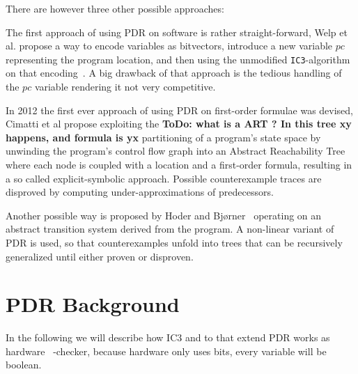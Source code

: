 \documentclass[11pt, a4paper, BCOR=10mm, ngerman]{scrbook}
\begin{document}
There are however three other possible approaches:

The first approach of using PDR on software is rather straight-forward, Welp et al. propose a way to encode variables as bitvectors, introduce a new variable $pc$ representing the program location, and then using the unmodified \texttt{IC3}-algorithm on that encoding~\cite{DBLP:conf/date/WelpK13}. A big drawback of that approach is the tedious handling of the $pc$ variable rendering it not very competitive.

In 2012 the first ever approach of using PDR on first-order formulae was devised, Cimatti et al \cite{DBLP:conf/cav/CimattiG12} propose exploiting the \textbf{ToDo: what is a ART ? In this tree xy happens, and formula is yx} partitioning of a program's state space by unwinding the program's control flow graph into an Abstract Reachability Tree where each node is coupled with a location and a first-order formula, resulting in a so called explicit-symbolic approach. Possible counterexample traces are disproved by computing under-approximations of predecessors. 

Another possible way is proposed by Hoder and Bj{\o}rner~\cite{DBLP:conf/sat/HoderB12} operating on an abstract transition system derived from the program. A non-linear variant of PDR is used, so that counterexamples unfold into trees that can be recursively generalized until either proven or disproven.




\chapter{PDR Background}
\label{PDR}
In the following we will describe how IC3 and to that extend PDR works as hardware \ -checker,
because hardware only uses bits, every variable will be boolean. 
\end{document}
